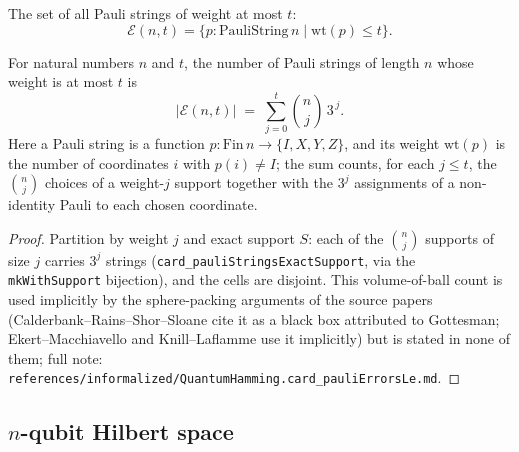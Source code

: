 \begin{definition}
\label{PauliErrorsLe}
\leanok
{}
The set of all Pauli strings of weight at most $t$:
\[
\mathcal{E}(n,t) = \bigl\{p : \mathrm{PauliString}\,n \;\big|\; \mathrm{wt}(p) \le t\bigr\}.
\]
\end{definition}

\begin{theorem}
\label{card_pauliErrorsLe}
\leanok
{}
For natural numbers $n$ and $t$, the number of Pauli strings of length $n$ whose weight
is at most $t$ is
\[
|\mathcal{E}(n,t)| \;=\; \sum_{j=0}^{t} \binom{n}{j}\, 3^{\,j}.
\]
Here a Pauli string is a function $p : \mathrm{Fin}\,n \to \{I,X,Y,Z\}$, and its weight
$\mathrm{wt}(p)$ is the number of coordinates $i$ with $p(i) \neq I$; the sum counts,
for each $j \le t$, the $\binom{n}{j}$ choices of a weight-$j$ support together with the
$3^{j}$ assignments of a non-identity Pauli to each chosen coordinate.
\end{theorem}

\begin{proof}
\leanok
Partition by weight $j$ and exact support $S$: each of the $\binom{n}{j}$
supports of size $j$ carries $3^{j}$ strings
(\texttt{card\_pauliStringsExactSupport}, via the \texttt{mkWithSupport}
bijection), and the cells are disjoint.  This volume-of-ball count is used
implicitly by the sphere-packing arguments of the source papers
(Calderbank--Rains--Shor--Sloane cite it as a black box attributed to
Gottesman; Ekert--Macchiavello and Knill--Laflamme use it implicitly) but is
stated in none of them; full note:
\texttt{references/informalized/QuantumHamming.card\_pauliErrorsLe.md}.
\end{proof}

\subsection{$n$-qubit Hilbert space}

